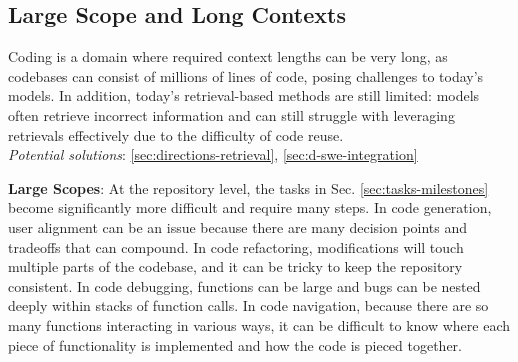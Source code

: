 
 



\subsection{Large Scope and Long Contexts} \label{sec:c-large-scope}

\begin{tcolorbox}[colback=lightgreen, boxrule=0pt, arc=5pt, outer arc=5pt, after skip=10pt plus 2pt]

Coding is a domain where required context lengths can be very long, as codebases can consist of millions of lines of code, posing challenges to today's models. In addition, today's retrieval-based methods are still limited: models often retrieve incorrect information and can still struggle with leveraging retrievals effectively due to the difficulty of code reuse.
\newline \\
\textit{Potential solutions}: \ref{sec:directions-retrieval}, \ref{sec:d-swe-integration}
\end{tcolorbox}

\textbf{Large Scopes}: At the repository level, the tasks in Sec. \ref{sec:tasks-milestones} become significantly more difficult and require many steps. In code generation, user alignment can be an issue because there are many decision points and tradeoffs that can compound. In code refactoring, modifications will touch multiple parts of the codebase, and it can be tricky to keep the repository consistent. In code debugging, functions can be large and bugs can be nested deeply within stacks of function calls. In code navigation, because there are so many functions interacting in various ways, it can be difficult to know where each piece of functionality is implemented and how the code is pieced together.

